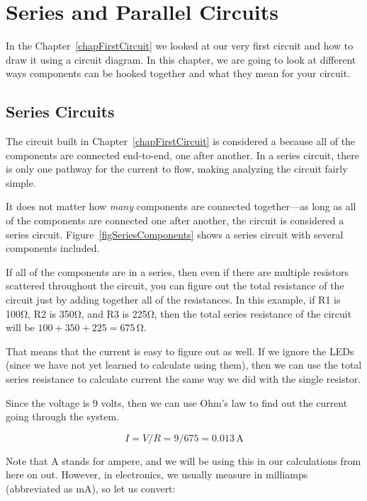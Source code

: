 \chapter{Series and Parallel Circuits}

In the Chapter~\ref{chapFirstCircuit} we looked at our very first circuit and how to draw it using a circuit diagram.
In this chapter, we are going to look at different ways components can be hooked together and what they mean for your circuit.

\section{Series Circuits}

The circuit built in Chapter~\ref{chapFirstCircuit} is considered a  because all of the components are connected end-to-end, one after another.
In a series circuit, there is only one pathway for the current to flow, making analyzing the circuit fairly simple.

It does not matter how \emph{many} components are connected together---as long as all of the components are connected one after another, the circuit is considered a series circuit.
Figure~\ref{figSeriesComponents} shows a series circuit with several components included.


If all of the components are in a series, then even if there are multiple resistors scattered throughout the circuit, you can figure out the total resistance of the circuit just by adding together all of the resistances.
In this example, if R1 is 100\si{\ohm}, R2 is 350\si{\ohm}, and R3 is 225\si{\ohm}, then the total series resistance of the circuit will be $100 + 350 + 225 = 675\,\si{\ohm}$.

That means that the current is easy to figure out as well.
If we ignore the LEDs (since we have not yet learned to calculate using them), then we can use the total series resistance to calculate current the same way we did with the single resistor.

Since the voltage is 9 volts, then we can use Ohm's law to find out the current going through the system.

$$I = V / R = 9 / 675 = 0.013\,\si{\ampere}$$

Note that \si{\ampere} stands for ampere, and we will be using this in our calculations from here on out.
However, in electronics, we usually measure in milliamps (abbreviated as \si{\milli\ampere}), so let us convert:

